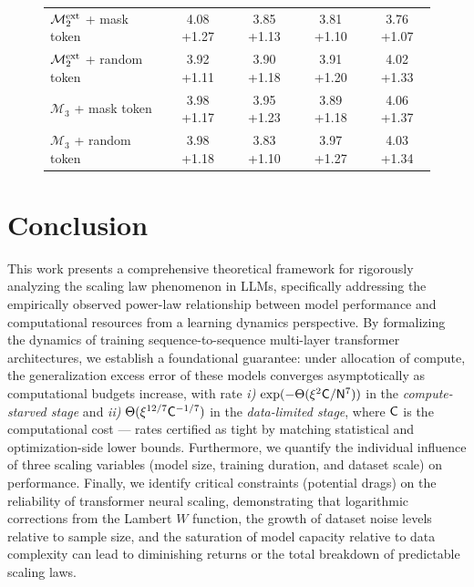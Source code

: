 \documentclass[11pt]{article}
\theoremstyle{plain}
\begin{document}
\begin{figure}[t]
\begin{minipage}[t]{0.49\linewidth}
{\begin{tabular}{@{}lcccc@{}}
$\mathcal{M}_2^{\rm ext}$ + mask token    & 4.08 {\color{red}\tiny +1.27} & 3.85 {\color{red}\tiny +1.13} & 3.81 {\color{red}\tiny +1.10} & 3.76 {\color{red}\tiny +1.07} \\
$\mathcal{M}_2^{\rm ext}$ + random token  & 3.92 {\color{red}\tiny +1.11} & 3.90 {\color{red}\tiny +1.18} & 3.91 {\color{red}\tiny +1.20} & 4.02 {\color{red}\tiny +1.33} \\
$\mathcal{M}_3$ + mask token              & 3.98 {\color{red}\tiny +1.17} & 3.95 {\color{red}\tiny +1.23} & 3.89 {\color{red}\tiny +1.18} & 4.06 {\color{red}\tiny +1.37} \\
$\mathcal{M}_3$ + random token            & 3.98 {\color{red}\tiny +1.18} & 3.83 {\color{red}\tiny +1.10} & 3.97 {\color{red}\tiny +1.27} & 4.03 {\color{red}\tiny +1.34} \\
\bottomrule
\end{tabular}}
\end{minipage}
\end{figure}
\section{Conclusion}\label{sec:conclusion}

This work presents a comprehensive theoretical framework for rigorously analyzing the scaling law phenomenon in LLMs, specifically addressing the empirically observed power-law relationship between model performance and computational resources from a learning dynamics perspective. By formalizing the dynamics of training sequence-to-sequence multi-layer transformer architectures, we establish a foundational guarantee: under allocation of compute, the generalization excess error of these models converges asymptotically as computational budgets increase, with rate {\it i)} $\exp(-\Theta(\xi^2{\sf C}/{\sf N}^7))$ in the {\it compute-starved stage} and {\it ii)} $\Theta(\xi^{12/7}{\sf C}^{-1/7})$ in the {\it data-limited stage}, where ${\sf C}$ is the computational cost --- rates certified as tight by matching statistical and optimization-side lower bounds. Furthermore, we quantify the individual influence of three scaling variables (model size, training duration, and dataset scale) on performance. Finally, we identify critical constraints (potential drags) on the reliability of transformer neural scaling, demonstrating that logarithmic corrections from the Lambert $W$ function, the growth of dataset noise levels relative to sample size, and the saturation of model capacity relative to data complexity can lead to diminishing returns or the total breakdown of predictable scaling laws.
\end{document}
